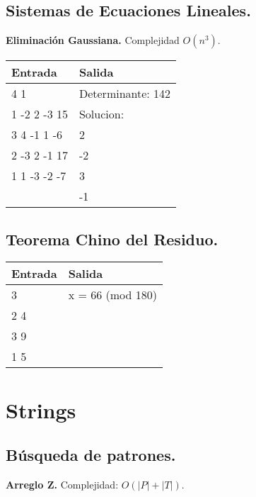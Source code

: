 \documentclass[10pt, letterpaper, twoside]{article}
\begin{document}
\subsection{Sistemas de Ecuaciones Lineales.}

\textbf{Eliminación Gaussiana.} Complejidad $O(n^3)$.



\begin{tabular}{|p{7cm}|p{7cm}|}
\hline
\textbf{Entrada} & \textbf{Salida}\\ \hline
4 1          & Determinante: 142\\
1 -2 2 -3 15 & Solucion:\\ 
3 4 -1 1 -6  & 2\\ 
2 -3 2 -1 17 & -2\\ 
1 1 -3 -2 -7 & 3\\ 
             & -1\\ \hline
\end{tabular}\bigskip

\subsection{Teorema Chino del Residuo.}



\begin{tabular}{|p{7cm}|p{7cm}|}
\hline
\textbf{Entrada} & \textbf{Salida}\\ \hline
3   & x = 66 (mod 180)\\
2 4 & \\ 
3 9 & \\ 
1 5 & \\ \hline
\end{tabular}\bigskip


\section{Strings}

\subsection{Búsqueda de patrones.}

\textbf{Arreglo Z.} Complejidad: $O(|P| + |T|)$.


\end{document}
